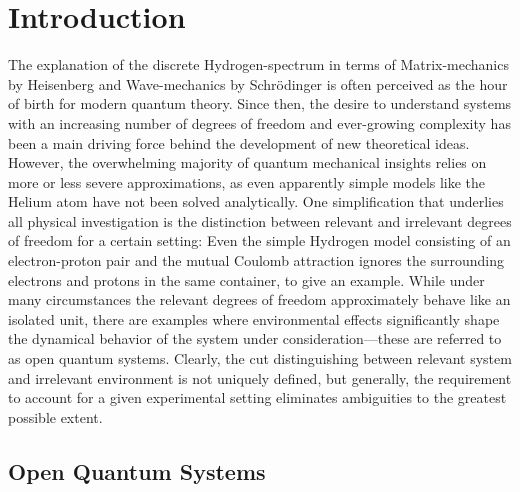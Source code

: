 \chapter{Introduction}
\label{chap:introduction}


The explanation of the discrete Hydrogen-spectrum in terms of Matrix-mechanics by Heisenberg and Wave-mechanics by Schrödinger is often perceived as the hour of birth for modern quantum theory.
Since then, the desire to understand systems with an increasing number of degrees of freedom and ever-growing complexity has been a main driving force behind the development of new theoretical ideas.
However, the overwhelming majority of quantum mechanical insights relies on more or less severe approximations, as even apparently simple models like the Helium atom have not been solved analytically.
One simplification that underlies all physical investigation is the distinction between relevant and irrelevant degrees of freedom for a certain setting:
Even the simple Hydrogen model consisting of an electron-proton pair and the mutual Coulomb attraction ignores the surrounding electrons and protons in the same container, to give an example.
While under many circumstances the relevant degrees of freedom approximately behave like an isolated unit, there are examples where environmental effects significantly shape the dynamical behavior of the system under consideration---these are referred to as open quantum systems.
Clearly, the cut distinguishing between relevant system and irrelevant environment is not uniquely defined, but generally, the requirement to account for a given experimental setting eliminates ambiguities to the greatest possible extent.

\section{Open Quantum Systems}
\label{sec:intro.open_quantum}

